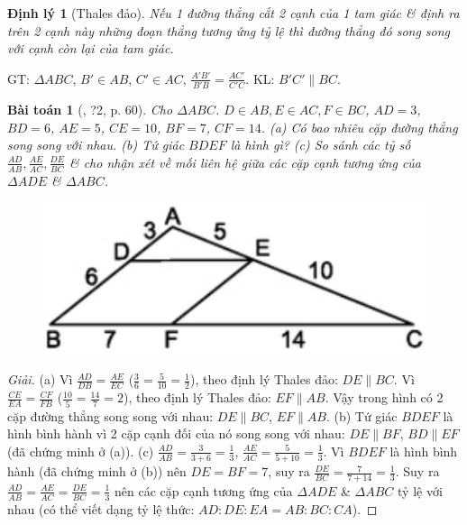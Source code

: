 \documentclass{article}
\newtheorem{baitoan}{Bài toán}
\newtheorem{dinhly}{Định lý}
\begin{document}
\begin{dinhly}[Thales đảo]
	Nếu 1 đường thẳng cắt 2 cạnh của 1 tam giác \& định ra trên 2 cạnh này những đoạn thẳng tương ứng tỷ lệ thì đường thẳng đó song song với cạnh còn lại của tam giác.
\end{dinhly}
GT: $\Delta ABC$, $B'\in AB$, $C'\in AC$, $\frac{A'B'}{B'B} = \frac{AC'}{C'C}$. KL: $B'C'\parallel BC$.

\begin{baitoan}[\cite{SGK_Toan_8_tap_2}, ?2, p. 60]
	Cho $\Delta ABC$. $D\in AB,E\in AC,F\in BC$, $AD = 3$, $BD = 6$, $AE = 5$, $CE = 10$, $BF = 7$, $CF = 14$. (a) Có bao nhiêu cặp đường thẳng song song với nhau. (b) Tứ giác $BDEF$ là hình gì? (c) So sánh các tỷ số $\frac{AD}{AB},\frac{AE}{AC},\frac{DE}{BC}$ \& cho nhận xét về mối liên hệ giữa các cặp cạnh tương ứng của $\Delta ADE$ \& $\Delta ABC$.
	\begin{figure}[H]
		\centering
		\includegraphics[scale=0.25]{SGK_Toan_8_9}
	\end{figure}
\end{baitoan}

\begin{proof}[Giải]	
	(a) Vì $\frac{AD}{DB} = \frac{AE}{EC}$ ($\frac{3}{6} = \frac{5}{10} = \frac{1}{2}$), theo định lý Thales đảo: $DE\parallel BC$. Vì $\frac{CE}{EA} = \frac{CF}{FB}$ ($\frac{10}{5} = \frac{14}{7} = 2$), theo định lý Thales đảo: $EF\parallel AB$. Vậy trong hình có 2 cặp đường thẳng song song với nhau: $DE\parallel BC$, $EF\parallel AB$. (b) Tứ giác $BDEF$ là hình bình hành vì 2 cặp cạnh đối của nó song song với nhau: $DE\parallel BF$, $BD\parallel EF$ (đã chứng minh ở (a)). (c) $\frac{AD}{AB} = \frac{3}{3 + 6} = \frac{1}{3}$, $\frac{AE}{AC} = \frac{5}{5 + 10} = \frac{1}{3}$. Vì $BDEF$ là hình bình hành (đã chứng minh ở (b)) nên $DE = BF = 7$, suy ra $\frac{DE}{BC} = \frac{7}{7 + 14} = \frac{1}{3}$. Suy ra $\frac{AD}{AB} = \frac{AE}{AC} = \frac{DE}{BC} = \frac{1}{3}$ nên các cặp cạnh tương ứng của $\Delta ADE$ \& $\Delta ABC$ tỷ lệ với nhau (có thể viết dạng tỷ lệ thức: $AD:DE:EA = AB:BC:CA$).
\end{proof}
\end{document}
